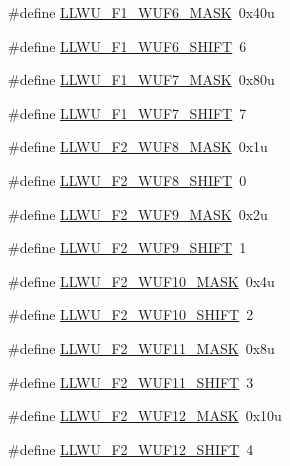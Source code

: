 \begin{DoxyCompactItemize}
\#define \hyperlink{group___l_l_w_u___register___masks_ga25c6fc1f914e4e6cdc9863e9910a7a18}{L\+L\+W\+U\+\_\+\+F1\+\_\+\+W\+U\+F6\+\_\+\+M\+A\+SK}~0x40u
\item 
\#define \hyperlink{group___l_l_w_u___register___masks_gadc6ba47e215a21859a0cdb07637e3720}{L\+L\+W\+U\+\_\+\+F1\+\_\+\+W\+U\+F6\+\_\+\+S\+H\+I\+FT}~6
\item 
\#define \hyperlink{group___l_l_w_u___register___masks_ga085396c6707e1233072318b9f791a179}{L\+L\+W\+U\+\_\+\+F1\+\_\+\+W\+U\+F7\+\_\+\+M\+A\+SK}~0x80u
\item 
\#define \hyperlink{group___l_l_w_u___register___masks_ga6ec44402fb6f1879376fce39e4f48618}{L\+L\+W\+U\+\_\+\+F1\+\_\+\+W\+U\+F7\+\_\+\+S\+H\+I\+FT}~7
\item 
\#define \hyperlink{group___l_l_w_u___register___masks_ga76228bf3593a9417e43e509166c07fad}{L\+L\+W\+U\+\_\+\+F2\+\_\+\+W\+U\+F8\+\_\+\+M\+A\+SK}~0x1u
\item 
\#define \hyperlink{group___l_l_w_u___register___masks_ga88963ab5583725d163689b615ce5a638}{L\+L\+W\+U\+\_\+\+F2\+\_\+\+W\+U\+F8\+\_\+\+S\+H\+I\+FT}~0
\item 
\#define \hyperlink{group___l_l_w_u___register___masks_ga28d89e3d08f5a7db6ffbe56e9e35d771}{L\+L\+W\+U\+\_\+\+F2\+\_\+\+W\+U\+F9\+\_\+\+M\+A\+SK}~0x2u
\item 
\#define \hyperlink{group___l_l_w_u___register___masks_gabc3e93b75e1e8e95f392b59b5dbf6edf}{L\+L\+W\+U\+\_\+\+F2\+\_\+\+W\+U\+F9\+\_\+\+S\+H\+I\+FT}~1
\item 
\#define \hyperlink{group___l_l_w_u___register___masks_gae005607b6cb3ebf1a7def97cd8b2abc5}{L\+L\+W\+U\+\_\+\+F2\+\_\+\+W\+U\+F10\+\_\+\+M\+A\+SK}~0x4u
\item 
\#define \hyperlink{group___l_l_w_u___register___masks_ga0ac579128aa08740377c46fd52be2bb5}{L\+L\+W\+U\+\_\+\+F2\+\_\+\+W\+U\+F10\+\_\+\+S\+H\+I\+FT}~2
\item 
\#define \hyperlink{group___l_l_w_u___register___masks_ga618834480f34a7997f2f4fab80d87400}{L\+L\+W\+U\+\_\+\+F2\+\_\+\+W\+U\+F11\+\_\+\+M\+A\+SK}~0x8u
\item 
\#define \hyperlink{group___l_l_w_u___register___masks_ga37c17efe2e5332ad92f9a05d9a15a2f2}{L\+L\+W\+U\+\_\+\+F2\+\_\+\+W\+U\+F11\+\_\+\+S\+H\+I\+FT}~3
\item 
\#define \hyperlink{group___l_l_w_u___register___masks_ga59dfa340c96f0c04fe3667e00dfb0575}{L\+L\+W\+U\+\_\+\+F2\+\_\+\+W\+U\+F12\+\_\+\+M\+A\+SK}~0x10u
\item 
\#define \hyperlink{group___l_l_w_u___register___masks_gae04234ed612320f80fe119820ae78e39}{L\+L\+W\+U\+\_\+\+F2\+\_\+\+W\+U\+F12\+\_\+\+S\+H\+I\+FT}~4

\end{DoxyCompactItemize}
